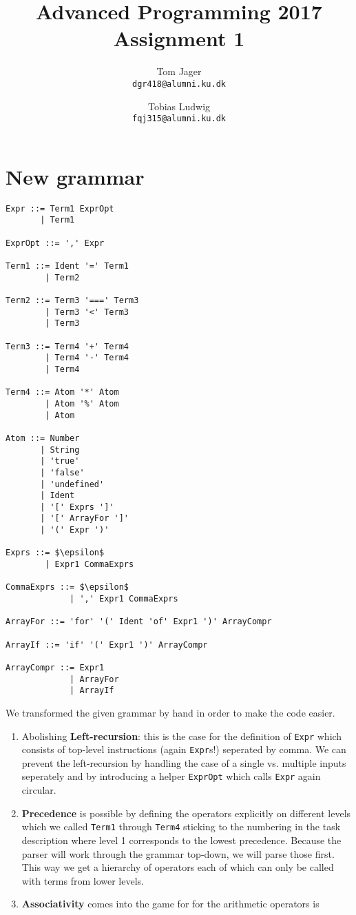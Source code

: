 \documentclass{article}
\title{Advanced Programming 2017\\Assignment 1}
\author{
Tom Jager\\
\texttt{dgr418@alumni.ku.dk}
\and
Tobias Ludwig\\
\texttt{fqj315@alumni.ku.dk}}
\begin{document}
\maketitle

\section{New grammar}

\begin{lstlisting}
Expr ::= Term1 ExprOpt
       | Term1

ExprOpt ::= ',' Expr

Term1 ::= Ident '=' Term1
        | Term2

Term2 ::= Term3 '===' Term3
        | Term3 '<' Term3
        | Term3

Term3 ::= Term4 '+' Term4
        | Term4 '-' Term4
        | Term4

Term4 ::= Atom '*' Atom
        | Atom '%' Atom
        | Atom

Atom ::= Number
       | String
       | 'true'
       | 'false'
       | 'undefined'
       | Ident
       | '[' Exprs ']'
       | '[' ArrayFor ']'
       | '(' Expr ')'

Exprs ::= $\epsilon$
        | Expr1 CommaExprs

CommaExprs ::= $\epsilon$
             | ',' Expr1 CommaExprs

ArrayFor ::= 'for' '(' Ident 'of' Expr1 ')' ArrayCompr

ArrayIf ::= 'if' '(' Expr1 ')' ArrayCompr

ArrayCompr ::= Expr1
             | ArrayFor
             | ArrayIf
\end{lstlisting}

We transformed the given grammar by hand in order to make the code easier.

\begin{enumerate}
 \item Abolishing \textbf{Left-recursion}: this is the case for the definition of \texttt{Expr} which consists of top-level instructions (again \texttt{Expr}s!)
 seperated by comma. We can prevent the left-recursion by handling the case of a single vs. multiple inputs seperately and by introducing
 a helper \texttt{ExprOpt} which calls \texttt{Expr} again circular.

 \item \textbf{Precedence} is possible by defining the operators explicitly on different levels which we called \texttt{Term1} through \texttt{Term4} sticking to
 the numbering in the task description where level 1 corresponds to the lowest precedence. Because the parser will work through the grammar top-down, we will parse those first.
 This way we get a hierarchy of operators each of which can only be called with terms from lower levels.
 
 \item \textbf{Associativity} comes into the game for for the arithmetic operators is 
\end{enumerate}
\end{document}
